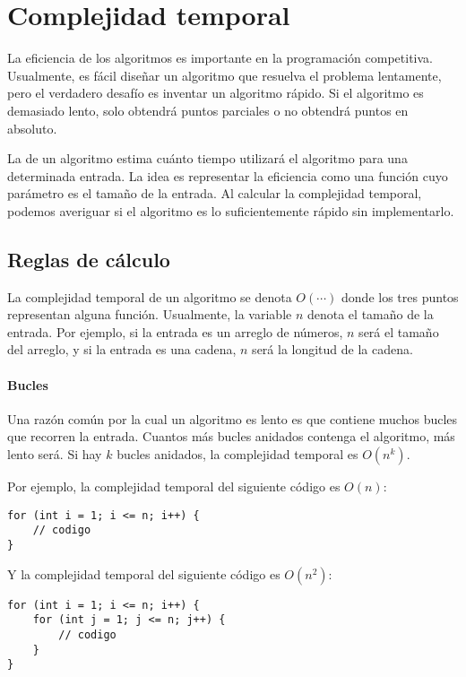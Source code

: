 \chapter{Complejidad temporal}


La eficiencia de los algoritmos es importante en la programación competitiva.
Usualmente, es fácil diseñar un algoritmo
que resuelva el problema lentamente,
pero el verdadero desafío es inventar un
algoritmo rápido.
Si el algoritmo es demasiado lento, solo obtendrá
puntos parciales o no obtendrá puntos en absoluto.

La  de un algoritmo
estima cuánto tiempo utilizará el algoritmo
para una determinada entrada.
La idea es representar la eficiencia
como una función cuyo parámetro es el tamaño de la entrada.
Al calcular la complejidad temporal,
podemos averiguar si el algoritmo es lo suficientemente rápido
sin implementarlo.

\section{Reglas de cálculo}

La complejidad temporal de un algoritmo
se denota $O(\cdots)$
donde los tres puntos representan alguna
función.
Usualmente, la variable $n$ denota
el tamaño de la entrada.
Por ejemplo, si la entrada es un arreglo de números,
$n$ será el tamaño del arreglo,
y si la entrada es una cadena,
$n$ será la longitud de la cadena.

\subsubsection*{Bucles}

Una razón común por la cual un algoritmo es lento es
que contiene muchos bucles que recorren la entrada.
Cuantos más bucles anidados contenga el algoritmo,
más lento será.
Si hay $k$ bucles anidados,
la complejidad temporal es $O(n^k)$.

Por ejemplo, la complejidad temporal del siguiente código es $O(n)$:
\begin{lstlisting}
for (int i = 1; i <= n; i++) {
    // codigo
}
\end{lstlisting}

Y la complejidad temporal del siguiente código es $O(n^2)$:
\begin{lstlisting}
for (int i = 1; i <= n; i++) {
    for (int j = 1; j <= n; j++) {
        // codigo
    }
}
\end{lstlisting}

